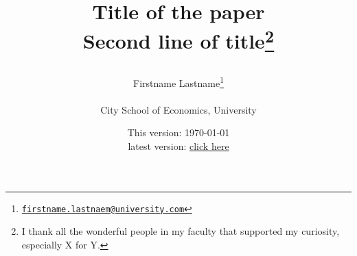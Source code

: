 \title{\vspace{-2.0cm}

Title of the paper\\
Second line of title\footnote{\scriptsize I thank all the wonderful people in my faculty that supported my curiosity, especially X for Y.} \vspace{0.5cm}}
\author{\vspace{0.5cm}Firstname Lastname\footnote{\href{mailto:firstname.lastname@university.com}{\nolinkurl{firstname.lastnaem@university.com}}}\\
\vspace{0.5cm}\\
City School of Economics, University}
\date{\vspace{0.0cm}\footnotesize This version: \today \vspace{0.5cm}\\
\vspace{0.2cm}\footnotesize latest version: \href{https://webpage.com/paper.pdf}{click here}\vspace{-0.8cm}}
